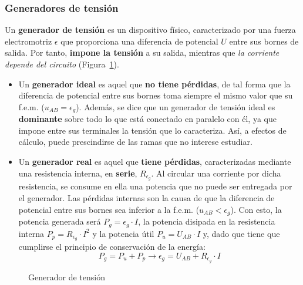 	\subsubsection{Generadores de tensión}
	Un \textbf{generador de tensión} es un dispositivo físico, caracterizado por una fuerza electromotriz $\epsilon$ que proporciona una diferencia de potencial $U$ entre sus bornes de salida. Por tanto, \textbf{impone la tensión} a su salida, mientras que \emph{la corriente depende del circuito} (Figura~\ref{fig.fuentetension}).
	\begin{itemize}
		\item Un \textbf{generador ideal} es aquel que \textbf{no tiene pérdidas}, de tal forma que la diferencia de potencial entre sus bornes toma siempre el mismo valor que su f.e.m. ($u_{AB}=\epsilon_g$). Además, se dice que un generador de tensión ideal es \textbf{dominante} sobre todo lo que está conectado en paralelo con él, ya que impone entre sus terminales la tensión que lo caracteriza. Así, a efectos de cálculo, puede prescindirse de las ramas que no interese estudiar.
		\item Un \textbf{generador real} es aquel que \textbf{tiene pérdidas}, caracterizadas mediante una resistencia interna, en \textbf{serie}, $R_{\epsilon_g}$. Al circular una corriente por dicha resistencia, se consume en ella una potencia que no puede ser entregada por el generador. Las pérdidas internas son la causa de que la diferencia de potencial entre sus bornes sea inferior a la f.e.m. ($u_{AB}<\epsilon_g$). Con esto, la potencia generada será $P_g=\epsilon_g\cdot I$, la potencia disipada en la resistencia interna $P_p=R_{\epsilon_g}\cdot I^2$ y la potencia útil $P_u=U_{AB}\cdot I$ y, dado que tiene que cumplirse el principio de conservación de la energía:
		\begin{equation}
			P_g=P_u+P_p\rightarrow \boxed{ \epsilon_g=U_{AB}+ R_{\epsilon_g}\cdot I}
		\end{equation}
	\end{itemize}
	\begin{figure}[H]
		\centering
		\hfil
		\caption{Generador de tensión}
		\label{fig.fuentetension}
	\end{figure}
	
